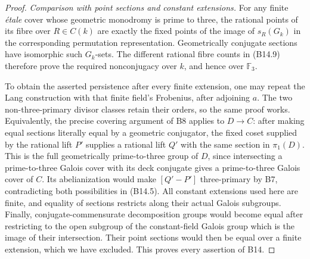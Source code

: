 \begin{proof}
\emph{Comparison with point sections and constant extensions.}
For any finite \emph{\'etale} cover whose geometric monodromy is
prime to three, the rational points of its fibre over $R\in C(k)$
are exactly the fixed points of the image of $s_R(G_k)$ in the
corresponding permutation representation. Geometrically conjugate
sections have isomorphic such $G_k$-sets. The different rational
fibre counts in (B14.9) therefore prove the required nonconjugacy
over $k$, and hence over $\mathbb F_3$.

To obtain the asserted persistence after every finite extension,
one may repeat the Lang construction with that finite field's
Frobenius, after adjoining $a$. The two non-three-primary divisor
classes retain their orders, so the same proof works. Equivalently,
the precise covering argument of B8 applies to $D\to C$: after
making equal sections literally equal by a geometric conjugator,
the fixed coset supplied by the rational lift $P'$ supplies a
rational lift $Q'$ with the same section in $\pi_1(D)$. This
is the full geometrically prime-to-three group of $D$, since
intersecting a prime-to-three Galois cover with its deck conjugate
gives a prime-to-three Galois cover of $C$. Its abelianization
would make $[Q'-P']$ three-primary by B7, contradicting both
possibilities in (B14.5). All constant extensions used here are
finite, and equality of sections restricts along their actual
Galois subgroups.
Finally, conjugate-commensurate decomposition groups would become
equal after restricting to the open subgroup of the constant-field
Galois group which is the image of their intersection. Their point
sections would then be equal over a finite extension, which we
have excluded. This proves every assertion of B14.
\end{proof}
